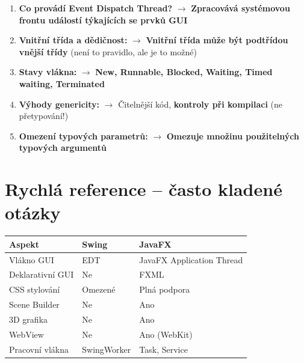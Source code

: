 \documentclass[11pt,a4paper]{article}
\begin{document}
\begin{enumerate}[label=\textbf{Otázka \arabic*:}]
    \item \textbf{Co provádí Event Dispatch Thread?} $\rightarrow$ \textbf{Zpracovává systémovou frontu událostí týkajících se prvků GUI}
    
    \item \textbf{Vnitřní třída a dědičnost:} $\rightarrow$ \textbf{Vnitřní třída může být podtřídou vnější třídy} (není to pravidlo, ale je to možné)
    
    \item \textbf{Stavy vlákna:} $\rightarrow$ \textbf{New, Runnable, Blocked, Waiting, Timed waiting, Terminated}
    
    \item \textbf{Výhody genericity:} $\rightarrow$ Čitelnější kód, \textbf{kontroly při kompilaci} (ne přetypování!)
    
    \item \textbf{Omezení typových parametrů:} $\rightarrow$ \textbf{Omezuje množinu použitelných typových argumentů}
\end{enumerate}

\section{Rychlá reference -- často kladené otázky}

\begin{tcolorbox}[defbox,title=Rozdíly Swing vs. JavaFX]
\begin{tabular}{>{\raggedright}p{3.5cm} >{\raggedright}p{5cm} >{\raggedright\arraybackslash}p{5cm}}
\toprule
\textbf{Aspekt} & \textbf{Swing} & \textbf{JavaFX} \\
\midrule
Vlákno GUI & EDT & JavaFX Application Thread \\
Deklarativní GUI & Ne & FXML \\
CSS stylování & Omezené & Plná podpora \\
Scene Builder & Ne & Ano \\
3D grafika & Ne & Ano \\
WebView & Ne & Ano (WebKit) \\
Pracovní vlákna & SwingWorker & Task, Service \\
\bottomrule
\end{tabular}
\end{tcolorbox}
\end{document}
